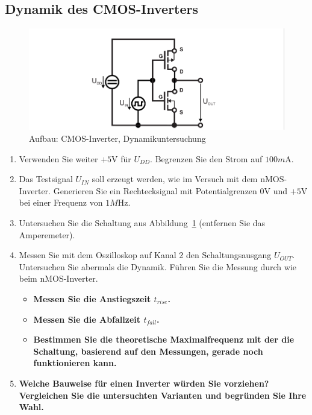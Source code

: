 \documentclass[10pt]{scrreprt}
\begin{document}
    \subsection{Dynamik des CMOS-Inverters}
    \begin{figure}[H]
        \includegraphics[width=\textwidth]{abb17.png}
        \caption{Aufbau: CMOS-Inverter, Dynamikuntersuchung}
        \label{fig:abb17}
    \end{figure}
    \begin{enumerate}
        \item Verwenden Sie weiter $+5\si{\volt}$ für $U_{DD}$. Begrenzen Sie den Strom auf $100\si{m\ampere}$.
        \item Das Testsignal $U_{IN}$ soll erzeugt werden, wie im Versuch mit dem nMOS-Inverter.
            Generieren Sie ein Rechtecksignal mit Potentialgrenzen $0\si{\volt}$ und $+5\si{\volt}$ bei einer
            Frequenz von $1\si{M\hertz}$.
        \item Untersuchen Sie die Schaltung aus Abbildung~\ref{fig:abb17} (entfernen Sie das Amperemeter).
        \item Messen Sie mit dem Oszilloskop auf Kanal 2 den Schaltungsausgang $U_{OUT}$. Untersuchen
            Sie abermals die Dynamik. Führen Sie die Messung durch wie beim nMOS-Inverter.
            \begin{itemize}
                \item \textbf{
                        Messen Sie die Anstiegszeit $t_{rise}$.
                    }
                \item \textbf{
                        Messen Sie die Abfallzeit $t_{fall}$.
                    }
                \item \textbf{
                        Bestimmen Sie die theoretische Maximalfrequenz mit der die
                        Schaltung, basierend auf den Messungen, gerade noch funktionieren kann.
                    }
            \end{itemize}
        \item \textbf{
            Welche Bauweise für einen Inverter würden Sie vorziehen? Vergleichen
            Sie die untersuchten Varianten und begründen Sie Ihre Wahl.
        }
    \end{enumerate}
\end{document}
